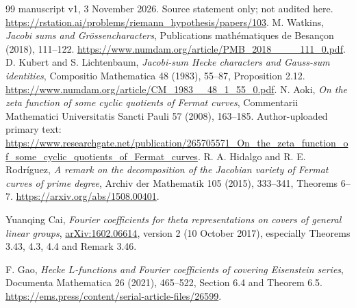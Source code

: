 \documentclass[11pt]{article}
\begin{document}
\begin{thebibliography}{99}
manuscript v1, 3 November 2026. Source statement only; not audited here.
\url{https://rstation.ai/problems/riemann_hypothesis/papers/103}.
 M. Watkins, \emph{Jacobi sums and Gr\"ossencharacters},
Publications math\'ematiques de Besan\c{c}on (2018), 111--122.
\url{https://www.numdam.org/article/PMB_2018____111_0.pdf}.
 D. Kubert and S. Lichtenbaum,
\emph{Jacobi-sum Hecke characters and Gauss-sum identities},
Compositio Mathematica 48 (1983), 55--87, Proposition 2.12.
\url{https://www.numdam.org/article/CM_1983__48_1_55_0.pdf}.
 N. Aoki, \emph{On the zeta function of some
cyclic quotients of Fermat curves}, Commentarii Mathematici
Universitatis Sancti Pauli 57 (2008), 163--185.
Author-uploaded primary text:
\url{https://www.researchgate.net/publication/265705571_On_the_zeta_function_of_some_cyclic_quotients_of_Fermat_curves}.
 R. A. Hidalgo and R. E. Rodr\'iguez,
\emph{A remark on the decomposition of the Jacobian variety of
Fermat curves of prime degree}, Archiv der Mathematik 105 (2015),
333--341, Theorems 6--7.
\url{https://arxiv.org/abs/1508.00401}.

Yuanqing Cai, \emph{Fourier coefficients for theta representations
on covers of general linear groups},
\href{https://arxiv.org/abs/1602.06614}{arXiv:1602.06614},
version 2 (10 October 2017), especially Theorems 3.43, 4.3, 4.4
and Remark 3.46.

F. Gao, \emph{Hecke \(L\)-functions and Fourier coefficients of covering
Eisenstein series}, Documenta Mathematica 26 (2021), 465--522,
Section 6.4 and Theorem 6.5.
\url{https://ems.press/content/serial-article-files/26599}.

\end{thebibliography}
\end{document}
